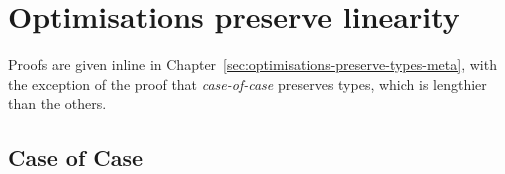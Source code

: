 \documentclass[acmsmall, screen, review]{acmart}
\begin{document}


\section{Optimisations preserve linearity}

Proofs are given inline in Chapter~\ref{sec:optimisations-preserve-types-meta},
with the exception of the proof that \emph{case-of-case} preserves types, which
is lengthier than the others.

\subsection{Case of Case\label{sec:proof:caseofcase}}



\end{document}
